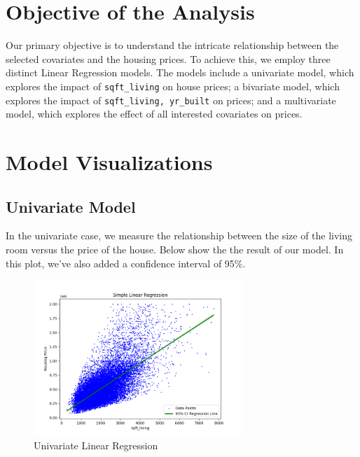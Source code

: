\documentclass[11pt,a4paper]{article}
\begin{document}
\newpage
\section{Objective of the Analysis}
Our primary objective is to understand the intricate relationship between the
selected covariates and the housing prices. To achieve this, we employ three
distinct Linear Regression models. The models include a univariate model, which
explores the impact of \verb|sqft_living| on house prices; a bivariate model,
which explores the impact of \verb|sqft_living, yr_built| on prices; and a
multivariate model, which explores the effect of all interested covariates on
prices.

\newpage
\section{Model Visualizations}

\subsection{Univariate Model}

In the univariate case, we measure the relationship between the size of the
living room versus the price of the house. Below show the the result of our
model. In this plot, we've also added a confidence interval of 95\%.

\begin{figure}[H]
    \centering
    \includegraphics*[width=0.7\textwidth]{simple_regression.png}
    \caption{Univariate Linear Regression}
    \label{fig: univariate}
\end{figure}
\end{document}

